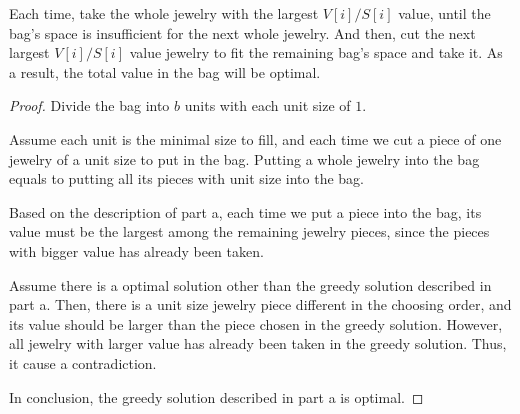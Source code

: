 \begin{homeworkProblem}

    \begin{homeworkSubProblem}

Each time, take the whole jewelry with the largest $V[i]/S[i]$ value,
until the bag's space is insufficient for the next whole jewelry.
And then, cut the next largest $V[i]/S[i]$ value jewelry to fit
the remaining bag's space and take it. As a result, the total value
in the bag will be optimal.

\end{homeworkSubProblem}

\begin{homeworkSubProblem}

\begin{proof}
Divide the bag into $b$ units with each unit size of $1$.

Assume each unit is the minimal size to fill,
and each time we cut a piece of one jewelry of a unit size
to put in the bag. Putting a whole jewelry into the bag equals
to putting all its pieces with unit size into the bag.

Based on the description of part a, 
each time we put a piece into the bag, its value
must be the largest among the remaining jewelry pieces,
since the pieces with bigger value has already been taken.

Assume there is a optimal solution other than the greedy solution
described in part a. Then, there is a unit size jewelry piece different
in the choosing order,
and its value should be larger than the piece chosen in the greedy
solution. However, all jewelry with larger value has already been taken
in the greedy solution. Thus, it cause a contradiction.

In conclusion, the greedy solution described in part a is optimal.
\end{proof}

\end{homeworkSubProblem}

\end{homeworkProblem}
